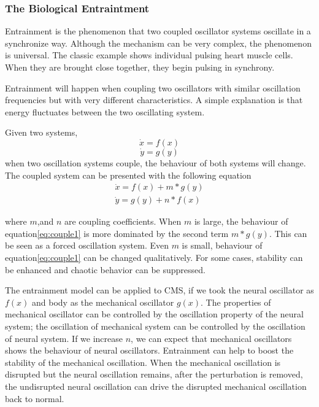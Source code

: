 \subsubsection{The Biological Entraintment}
Entrainment is the phenomenon that two coupled oscillator systems oscillate in a synchronize way. 
Although the mechanism can be very complex, the phenomenon is universal. 
The classic example shows individual pulsing heart muscle cells.
When they are brought close together, they begin pulsing in synchrony. 

Entrainment will happen when coupling two oscillators with similar oscillation frequencies but with very different characteristics. 
A simple explanation is that energy fluctuates between the two oscillating system.

Given two systems,
\[
\dot x=f(x)
\]
\[
\dot y=g(y)
\]
when two oscillation systems couple, the behaviour of both systems will change. 
The coupled system can be presented with the following equation
\begin{eqnarray}
\dot x=f(x)+m*g(y) \label{eq:couple1}\\
\dot y=g(y)+n*f(x) \label{eq:coule2}
\label{eq:couple}
\end{eqnarray}

where $m$,and $n$ are coupling coefficients. 
When $m$ is large, the behaviour of equation\eqref{eq:couple1} is more dominated by the second term $m*g(y)$. 
This can be seen as a forced oscillation system. 
Even $m$ is small, behaviour of equation\eqref{eq:couple1} can be changed qualitatively.
For some cases, stability can be enhanced and chaotic behavior can be suppressed.


The entrainment model can be applied to CMS, if we took the neural oscillator as $f(x)$ and body as the mechanical oscillator $g(x)$.
The properties of mechanical oscillator can be controlled by the oscillation property of the neural system; the oscillation of mechanical system can be controlled by the oscillation of neural system.
If we increase $n$, we can expect that mechanical oscillators shows the behaviour of neural oscillators. 
Entrainment can help to boost the stability of the mechanical oscillation.
When the mechanical oscillation is disrupted but the neural oscillation remains, after the perturbation is removed, the undisrupted neural oscillation can drive the disrupted mechanical oscillation back to normal.



